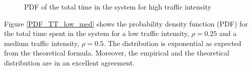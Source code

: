 \documentclass[12pt, a4paper]{article}
\begin{document}
\begin{figure}[H]
  \centering
  \hspace{0px}
  \caption{PDF of the total time in the system for high traffic intensity}
  \label{PDF_TT_high}
\end{figure}

Figure \ref{PDF_TT_low_med} shows the probability density function (PDF) 
for the total time spent in the system for a low traffic intensity, $\rho = 0.25$
and a medium traffic intensity, $\rho=0.5$. The distribution is exponential as expected
from the theoretical formula. Moreover, the empirical and the theoretical distribution
are in an excellent agreement.
\end{document}

